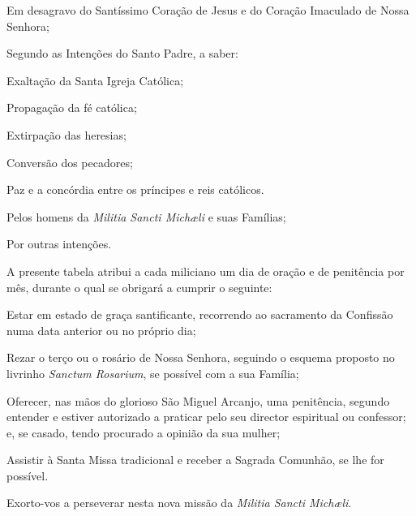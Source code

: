 \documentclass[paper=a5,10pt,openany]{scrbook}
\begin{document}
\begin{compactitem}
\item Em desagravo do Santíssimo Coração de Jesus e do Coração Imaculado de Nossa Senhora;

\item Segundo as Intenções do Santo Padre, a saber: 
\begin{compactitem}
\item Exaltação da Santa Igreja Católica; 

\item Propagação da fé católica; 

\item Extirpação das heresias; 

\item Conversão dos pecadores; 

\item Paz e a concórdia entre os príncipes e reis católicos.
\end{compactitem}
\item Pelos homens da \textit{Militia Sancti Michæli} e suas Famílias;

\item Por outras intenções.
\end{compactitem}

A presente tabela atribui a cada miliciano um dia de oração e de penitência por mês, durante o qual se obrigará a cumprir o seguinte:

\begin{compactitem}
\item Estar em estado de graça santificante, recorrendo ao sacramento da Confissão numa data anterior ou no próprio dia;

\item Rezar o terço ou o rosário de Nossa Senhora, seguindo o esquema proposto no livrinho \textit{Sanctum Rosarium}, se possível com a sua Família;

\item Oferecer, nas mãos do glorioso São Miguel Arcanjo, uma penitência, segundo entender e estiver autorizado a praticar pelo seu director espiritual ou confessor; e, se casado, tendo procurado a opinião da sua mulher;

\item Assistir à Santa Missa tradicional e receber a Sagrada Comunhão, se lhe for possível.
\end{compactitem}

Exorto-vos a perseverar nesta nova missão da \textit{Militia Sancti Michæli}.
\end{document}
